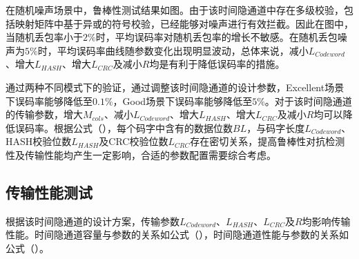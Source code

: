 在随机噪声场景中，鲁棒性测试结果如图。由于该时间隐通道中存在多级校验，包括映射矩阵中基于异或的符号校验，已经能够对噪声进行有效拦截。因此在图中，当随机丢包率小于$2\%$时，平均误码率对随机丢包率的增长不敏感。在随机丢包噪声为$5\%$时，平均误码率曲线随参数变化出现明显波动，总体来说，减小$L_{Codeword}$、增大$L_{HASH}$、增大$L_{CRC}$及减小$R$均是有利于降低误码率的措施。

通过两种不同模式下的验证，通过调整该时间隐通道的设计参数，Excellent场景下误码率能够降低至$0.1\%$，Good场景下误码率能够降低至$5\%$。对于该时间隐通道的传输参数，增大$M_{cols}$、减小$L_{Codeword}$、增大$L_{HASH}$、增大$L_{CRC}$及减小$R$均可以降低误码率。根据公式（），每个码字中含有的数据位数$BL$，与码字长度$L_{Codeword}$、HASH校验位数$L_{HASH}$及CRC校验位数$L_{CRC}$存在密切关系，提高鲁棒性对抗检测性及传输性能均产生一定影响，合适的参数配置需要综合考虑。

\subsection{传输性能测试}
\label{chap:hash:result:throughput}

根据该时间隐通道的设计方案，传输参数$L_{Codeword}$、$L_{HASH}$、$L_{CRC}$及$R$均影响传输性能。时间隐通道容量与参数的关系如公式（），时间隐通道性能与参数的关系如公式（）。


